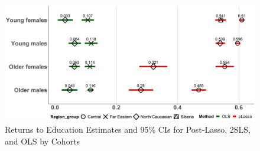\documentclass[a4paper,12pt,twoside]{book}
\begin{document}
\begin{figure}[H]
	\includegraphics[width=\textwidth]{iv_by_districts.png}
	\caption{Returns to Education Estimates and 95\% CIs for Post-Lasso, 2SLS, and OLS by Cohorts} \label{fig:5.5}
\end{figure}
\end{document}
